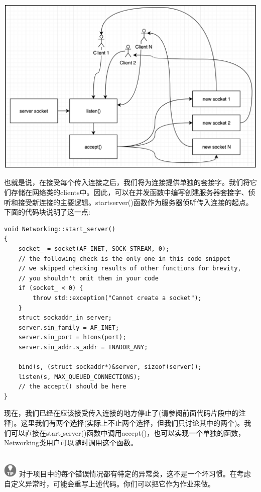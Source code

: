 \begin{center}
	\includegraphics[width=1.0\textwidth]{content/Section-2/Chapter-12/12}
\end{center}

也就是说，在接受每个传入连接之后，我们将为连接提供单独的套接字。我们将它们存储在网络类的clients\underline{}中。因此，可以在并发函数中编写创建服务器套接字、侦听和接受新连接的主要逻辑。start\underline{}server()函数作为服务器侦听传入连接的起点。下面的代码块说明了这一点: \par

\begin{lstlisting}[caption={}]
void Networking::start_server()
{
	socket_ = socket(AF_INET, SOCK_STREAM, 0);
	// the following check is the only one in this code snippet
	// we skipped checking results of other functions for brevity,
	// you shouldn't omit them in your code
	if (socket_ < 0) {
		throw std::exception("Cannot create a socket");
	}
	struct sockaddr_in server;
	server.sin_family = AF_INET;
	server.sin_port = htons(port);
	server.sin_addr.s_addr = INADDR_ANY;
	
	bind(s, (struct sockaddr*)&server, sizeof(server));
	listen(s, MAX_QUEUED_CONNECTIONS);
	// the accept() should be here
}
\end{lstlisting}

现在，我们已经在应该接受传入连接的地方停止了(请参阅前面代码片段中的注释)。这里我们有两个选择(实际上不止两个选择，但我们只讨论其中的两个)。我们可以直接在start\underline{ }server()函数中调用accept()，也可以实现一个单独的函数，Networking类用户可以随时调用这个函数。 \par

\hspace*{\fill} \\ %
\includegraphics[width=0.05\textwidth]{images/tip}
对于项目中的每个错误情况都有特定的异常类，这不是一个坏习惯。在考虑自定义异常时，可能会重写上述代码。你们可以把它作为作业来做。 \par
\noindent\textbf{}\ \par

